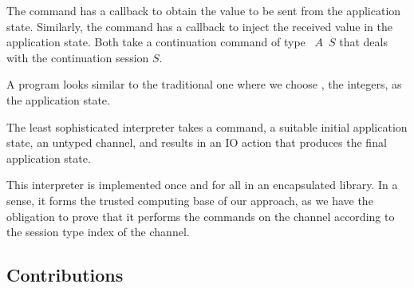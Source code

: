 \documentclass[acmsmall,screen,anonymous,review]{acmart}
\begin{document}
\begin{description}
  The {\ACSEND} command has a callback to obtain the value to be sent
  from the application state. Similarly, the {\ACRECV} command has a
  callback to inject the received value in the application state. Both
  take a continuation command of type {\ACommand~$A$~$S$} that deals
  with the continuation session $S$.

  A program looks similar to the traditional one where we choose
  {\AZ}, the integers, as the application state.
\stNegpCommand

  The least sophisticated interpreter takes a command, a suitable
  initial application state, an untyped channel, and results in an IO
  action that produces the final application state.
\stExecutorSignature

  This interpreter is implemented once and for all in an encapsulated
  library. In a sense, it forms the trusted computing base of our
  approach, as we have the obligation to prove that it performs the
  commands on the channel according to the session type index of the
  channel. 
\end{description}

\subsection{Contributions}
\label{sec:contributions}
\end{document}
